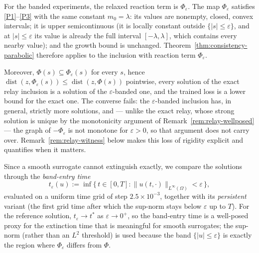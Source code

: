 \documentclass[11pt]{elsarticle}
\theoremstyle{definition}
\theoremstyle{remark}
\numberwithin{equation}{section}
\def\dist{\operatorname{dist}}
\begin{document}
For the banded experiments, the relaxed reaction term is $\Phi_\varepsilon$. The map $\Phi_\varepsilon$ satisfies \ref{P1}--\ref{P3} with the same constant
$m_0=\lambda$: its values are nonempty, closed, convex intervals; it is
upper semicontinuous (it is locally constant outside
$\{|s|\le\varepsilon\}$, and at $|s|\le\varepsilon$ its value is already the
full interval $[-\lambda,\lambda]$, which contains every nearby value);
and the growth bound is unchanged.
Theorem~\ref{thm:consistency-parabolic} therefore applies to the inclusion
with reaction term $\Phi_\varepsilon$.

Moreover, $\Phi(s)\subseteq\Phi_\varepsilon(s)$ for every $s$, hence
$\dist(z,\Phi_\varepsilon(s))\le\dist(z,\Phi(s))$ pointwise, every
solution of the exact relay inclusion is a solution of the
$\varepsilon$-banded one, and the trained loss is a lower bound for the
exact one. The converse fails: the $\varepsilon$-banded inclusion has, in
general, strictly more solutions, and --- unlike the exact relay, whose
strong solution is unique by the monotonicity argument of
Remark~\ref{rem:relay-wellposed} --- the graph of $-\Phi_\varepsilon$ is
not monotone for $\varepsilon>0$, so that argument does not carry over.
Remark~\ref{rem:relay-witness} below makes this loss of rigidity explicit
and quantifies when it matters.

Since a smooth surrogate cannot extinguish exactly, we compare the
solutions through the \emph{band-entry time}
\begin{equation}
	\label{eq:relay-tband}
	t_\varepsilon(u) := \inf\bigl\{\, t\in[0,T] :
	\|u(t,\cdot)\|_{L^\infty(\Omega)} < \varepsilon \,\bigr\},
\end{equation}
evaluated on a uniform time grid of step $2.5\times10^{-3}$, together
with its \emph{persistent} variant (the first grid time after which the
sup-norm stays below $\varepsilon$ up to $T$). For the reference
solution, $t_\varepsilon\to t^*$ as $\varepsilon\to0^+$, so the
band-entry time is a well-posed proxy for the extinction time that is
meaningful for smooth surrogates; the sup-norm (rather than an $L^2$
threshold) is used because the band $\{|u|\le\varepsilon\}$ is exactly
the region where $\Phi_\varepsilon$ differs from $\Phi$.
\end{document}
